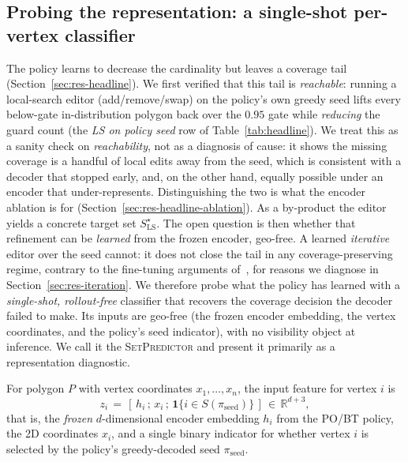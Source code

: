 \documentclass[11pt]{article}
\newcommand{\SetPredictor}{\textup{\textsc{SetPredictor}}}
\begin{document}
\subsection{Probing the representation: a single-shot per-vertex classifier}
\label{sec:method-arch}


The policy learns to decrease the cardinality but leaves a coverage tail (Section~\ref{sec:res-headline}). We first verified that this tail is \emph{reachable}: running a local-search editor (add/remove/swap) on the policy's own greedy seed lifts every below-gate in-distribution polygon back over the $0.95$ gate while \emph{reducing} the guard count (the \emph{LS on policy seed} row of Table~\ref{tab:headline}). We treat this as a sanity check on \emph{reachability}, not as a diagnosis of cause: it shows the missing coverage is a handful of local edits away from the seed, which is consistent with a decoder that stopped early, and, on the other hand, equally possible under an encoder that under-represents. Distinguishing the two is what the encoder ablation is for (Section~\ref{sec:res-headline-ablation}). As a by-product the editor yields a concrete target set $S^\star_{\mathrm{LS}}$. The open question is then whether that refinement can be \emph{learned} from the frozen encoder, geo-free. A learned \emph{iterative} editor over the seed cannot: it does not close the tail in any coverage-preserving regime, contrary to the fine-tuning arguments of~\cite{Pan2025PO}, for reasons we diagnose in Section~\ref{sec:res-iteration}. We therefore probe what the policy has learned with a \emph{single-shot, rollout-free} classifier that recovers the coverage decision the decoder failed to make. Its inputs are geo-free (the frozen encoder embedding, the vertex coordinates, and the policy's seed indicator), with no visibility object at inference. We call it the \SetPredictor{} and present it primarily as a representation diagnostic.

For polygon $P$ with vertex coordinates $x_1, \dots, x_n$, the input feature for vertex $i$ is
\begin{equation}
z_i \,=\, [\, h_i \,;\, x_i \,;\, \mathbf{1}\{i \in S(\pi_{\mathrm{seed}})\} \,] \,\in\, \mathbb{R}^{d+3},
\label{eq:setpred-feat}
\end{equation}
that is, the \emph{frozen} $d$-dimensional encoder embedding $h_i$ from the PO/BT policy, the 2D coordinates $x_i$, and a single binary indicator for whether vertex $i$ is selected by the policy's greedy-decoded seed $\pi_{\mathrm{seed}}$. 
\end{document}
